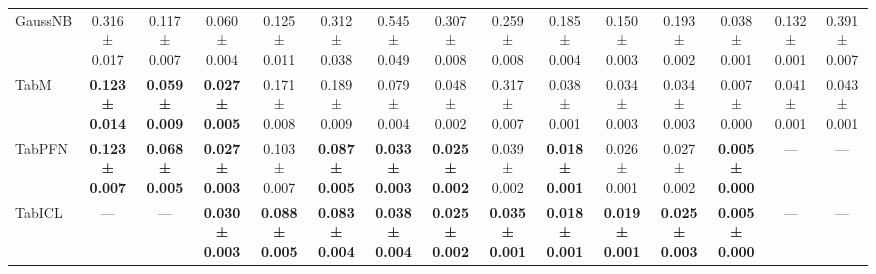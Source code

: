 \begin{table}[H]
{\begin{tabular}{lcccccccccccccc}
    GaussNB & 0.316 ± 0.017 & 0.117 ± 0.007 & 0.060 ± 0.004 & 0.125 ± 0.011 & 0.312 ± 0.038 & 0.545 ± 0.049 & 0.307 ± 0.008 & 0.259 ± 0.008 & 0.185 ± 0.004 & 0.150 ± 0.003 & 0.193 ± 0.002 & 0.038 ± 0.001 & 0.132 ± 0.001 & 0.391 ± 0.007 \\
    TabM & \textbf{0.123 ± 0.014} & \textbf{0.059 ± 0.009} & \textbf{0.027 ± 0.005} & 0.171 ± 0.008 & 0.189 ± 0.009 & 0.079 ± 0.004 & 0.048 ± 0.002 & 0.317 ± 0.007 & 0.038 ± 0.001 & 0.034 ± 0.003 & 0.034 ± 0.003 & 0.007 ± 0.000 & 0.041 ± 0.001 & 0.043 ± 0.001 \\
    TabPFN & \textbf{0.123 ± 0.007} & \textbf{0.068 ± 0.005} & \textbf{0.027 ± 0.003} & 0.103 ± 0.007 & \textbf{0.087 ± 0.005} & \textbf{0.033 ± 0.003} & \textbf{0.025 ± 0.002} & 0.039 ± 0.002 & \textbf{0.018 ± 0.001} & 0.026 ± 0.001 & 0.027 ± 0.002 & \textbf{0.005 ± 0.000} & — & — \\
    TabICL & — & — & \textbf{0.030 ± 0.003} & \textbf{0.088 ± 0.005} & \textbf{0.083 ± 0.004} & \textbf{0.038 ± 0.004} & \textbf{0.025 ± 0.002} & \textbf{0.035 ± 0.001} & \textbf{0.018 ± 0.001} & \textbf{0.019 ± 0.001} & \textbf{0.025 ± 0.003} & \textbf{0.005 ± 0.000} & — & — \\
    \bottomrule
\end{tabular}
    }
\end{table}
